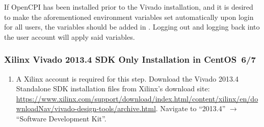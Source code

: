 \begin{flushleft}
\begin{flushleft}
\begin{enumerate}
\subitem {}
\subitem {}

\end{enumerate}
If OpenCPI has been installed prior to the Vivado installation, and it is desired to make the aforementioned environment variables set automatically upon login for all users, the variables should be added in . Logging out and logging back into the user account will apply said variables.
\subsubsection{Xilinx Vivado 2013.4 SDK Only Installation in CentOS~6/7}
\label{sec:viv_sdk}
\begin{enumerate}
\item A Xilinx account is required for this step. Download the Vivado 2013.4 Standalone SDK installation files from Xilinx's download site:
\url{https://www.xilinx.com/support/download/index.html/content/xilinx/en/downloadNav/vivado-design-tools/archive.html}. Navigate to ``2013.4'' $\rightarrow$ ``Software Development Kit''.


\end{enumerate}
\end{flushleft}
\end{flushleft}
